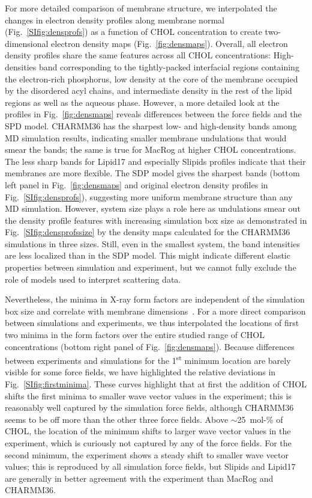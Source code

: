 \documentclass[journal=jctcce]{achemso}
\begin{document}
For more detailed comparison of membrane structure, we interpolated the changes in electron density profiles along membrane normal (Fig.~\ref{SIfig:densprofs}) as a function of CHOL concentration to create two-dimensional electron density maps (Fig.~\ref{fig:densmaps}). Overall, all electron density profiles share the same features across all CHOL concentrations: High-densities band corresponding to the tightly-packed interfacial regions containing the electron-rich phosphorus, low density at the core of the membrane occupied by the disordered acyl chains, and intermediate density in the rest of the lipid regions as well as the aqueous phase. However, a more detailed look at the profiles in Fig.~\ref{fig:densmaps} reveals differences between the force fields and the SPD model. CHARMM36 has the sharpest low- and high-density bands among MD simulation results, indicating smaller membrane undulations that would smear the bands; the same is true for MacRog at higher CHOL concentrations. The less sharp bands for Lipid17 and especially Slipids profiles indicate that their membranes are more flexible. The SDP model gives the sharpest bands (bottom left panel in Fig.~\ref{fig:densmaps} and original electron density profiles in Fig.~\ref{SIfig:densprofs}), suggesting more uniform membrane structure than any MD simulation. However, system size plays a role here as  undulations smear out the density profile features with increasing simulation box size as demonstrated in Fig.~\ref{SIfig:densprofssize} by the density maps calculated for the CHARMM36 simulations in three sizes.  Still, even in the smallest system, the band intensities are less localized than in the SDP model. This might indicate different elastic properties between simulation and experiment, but we cannot fully exclude the role of models used to interpret scattering data.

Nevertheless, the minima in X-ray  form factors are independent of the simulation box size and correlate with membrane dimensions~\cite{NMRlipidsDatabank}. For a more direct comparison between simulations and experiments, we thus interpolated the locations of first two minima in the form factors over the entire studied range of CHOL concentrations (bottom right panel of Fig.~\ref{fig:densmaps}). Because differences between experiments and simulations for the 1\textsuperscript{st} minimum location are barely visible for some force fields, we have highlighted the relative deviations in Fig.~\ref{SIfig:firstminima}. These curves highlight that at first the addition of CHOL shifts the first minima to smaller wave vector values in the experiment; this is reasonably well captured by the simulation force fields, although CHARMM36 seems to be off more than the other three force fields. Above $\sim$25~mol-\% of CHOL, the location of the minimum shifts to larger wave vector values in the experiment, which is curiously not captured by any of the force fields. For the second minimum, the experiment shows a steady shift to smaller wave vector values; this is reproduced by all simulation force fields, but Slipids and Lipid17 are generally in better agreement with the experiment than MacRog and CHARMM36.
\end{document}
